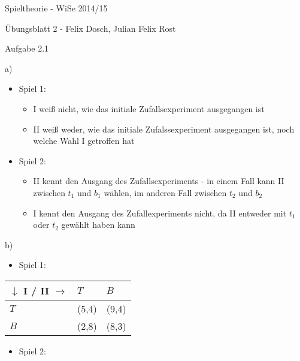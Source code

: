 \documentclass{scrartcl}
\begin{document}
\begin{LARGE}
Spieltheorie - WiSe 2014/15
\end{LARGE}

\begin{Large}
Übungsblatt 2 - Felix Dosch, Julian Felix Rost\\[1.0cm]
\end{Large}

\begin{Large}
Aufgabe 2.1\\[0.0cm]
\end{Large}

a) 

\begin{itemize}
\item{Spiel 1:}
\begin{itemize}
\item{I weiß nicht, wie das initiale Zufallsexperiment ausgegangen ist}
\item{II weiß weder, wie das initiale Zufalssexperiment ausgegangen ist, noch welche Wahl I getroffen hat}
\end{itemize}
\item{Spiel 2:}
\begin{itemize}
\item{II kennt den Ausgang des Zufallsexperiments - in einem Fall kann II zwischen $t_1$ und $b_1$ wählen,
im anderen Fall zwischen $t_2$ und $b_2$}
\item{I kennt den Ausgang des Zufallexperiments nicht, da II entweder mit $t_1$ oder $t_2$ gewählt haben kann}
\end{itemize}
\end{itemize}

b)
\begin{itemize}
\item{Spiel 1:}
\end{itemize}

\begin{tabularx}{0.5\textwidth} {|X|X|X|}
\hline
$\downarrow$ I / II $\rightarrow$	& $T$		& $B$	\\
\hline
$T$					& (5,4)			& (9,4)	\\
\hline
$B$					& (2,8)			& (8,3)	\\
\hline
\end{tabularx}

\begin{itemize}
\item{Spiel 2:}
\end{itemize}
\end{document}
